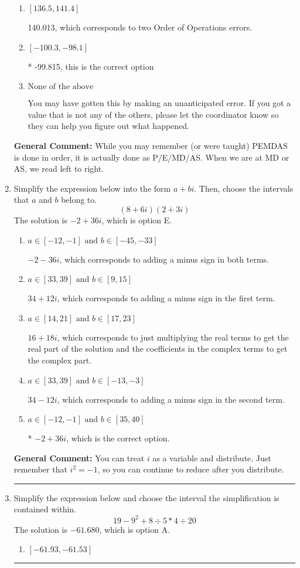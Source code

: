 \documentclass{extbook}[14pt]
\newcommand{\litem}[1]{\item #1

\rule{\textwidth}{0.4pt}}
\begin{document}
\begin{enumerate}
{\begin{enumerate}[label=\Alph*.]
 -101.987, which corresponds to an Order of Operations error: not reading left-to-right for multiplication/division.
\item \( [136.5, 141.4] \)

 140.013, which corresponds to two Order of Operations errors.
\item \( [-100.3, -98.1] \)

* -99.815, this is the correct option
\item \( \text{None of the above} \)

 You may have gotten this by making an unanticipated error. If you got a value that is not any of the others, please let the coordinator know so they can help you figure out what happened.
\end{enumerate}

\textbf{General Comment:} While you may remember (or were taught) PEMDAS is done in order, it is actually done as P/E/MD/AS. When we are at MD or AS, we read left to right.
}
\litem{
Simplify the expression below into the form $a+bi$. Then, choose the intervals that $a$ and $b$ belong to.
\[ (8 + 6 i)(2 + 3 i) \]The solution is \( -2 + 36 i \), which is option E.\begin{enumerate}[label=\Alph*.]
\item \( a \in [-12, -1] \text{ and } b \in [-45, -33] \)

 $-2 - 36 i$, which corresponds to adding a minus sign in both terms.
\item \( a \in [33, 39] \text{ and } b \in [9, 15] \)

 $34 + 12 i$, which corresponds to adding a minus sign in the first term.
\item \( a \in [14, 21] \text{ and } b \in [17, 23] \)

 $16 + 18 i$, which corresponds to just multiplying the real terms to get the real part of the solution and the coefficients in the complex terms to get the complex part.
\item \( a \in [33, 39] \text{ and } b \in [-13, -3] \)

 $34 - 12 i$, which corresponds to adding a minus sign in the second term.
\item \( a \in [-12, -1] \text{ and } b \in [35, 40] \)

* $-2 + 36 i$, which is the correct option.
\end{enumerate}

\textbf{General Comment:} You can treat $i$ as a variable and distribute. Just remember that $i^2=-1$, so you can continue to reduce after you distribute.
}
\litem{
Simplify the expression below and choose the interval the simplification is contained within.
\[ 19 - 9^2 + 8 \div 5 * 4 \div 20 \]The solution is \( -61.680 \), which is option A.\begin{enumerate}[label=\Alph*.]
\item \( [-61.93, -61.53] \)


\end{enumerate}}
\end{enumerate}
\end{document}
